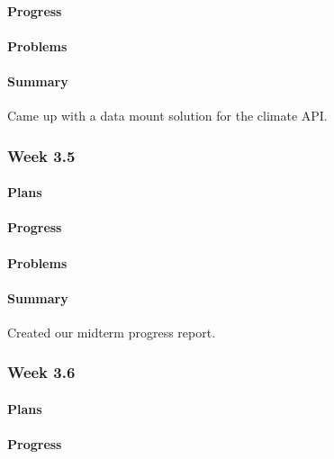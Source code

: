 \documentclass[onecolumn, draftclsnofoot,10pt, compsoc]{article}
\begin{document}
		    \paragraph{Progress} \hfill \break
		
		    \paragraph{Problems} \hfill \break
		       
		    \paragraph{Summary} \hfill \break
		        Came up with a data mount solution for the climate API. 
		       
		\subsubsection{Week 3.5}
		    \paragraph{Plans} \hfill \break
		     
		    \paragraph{Progress} \hfill \break
		       
		    \paragraph{Problems} \hfill \break
		     
		    \paragraph{Summary} \hfill \break
		        Created our midterm progress report.

		\subsubsection{Week 3.6}
		    \paragraph{Plans} \hfill \break
		       
		    \paragraph{Progress} \hfill \break
		      
\end{document}
